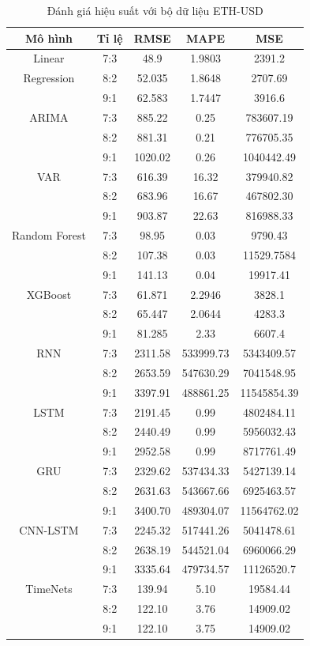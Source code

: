 \documentclass[conference]{IEEEtran}
\begin{document}
\begin{table}[H]
 \centering
 \caption{Đánh giá hiệu suất với bộ dữ liệu ETH-USD}
\begin{adjustbox}{width=0.4\textwidth}
\begin{tabular}{|c|c|c|c|c|}
\hline
Mô hình & Tỉ lệ & RMSE & MAPE & MSE \\ \hline
Linear & 7:3 & 48.9 & 1.9803 & 2391.2 \\
Regression & 8:2 & 52.035 & 1.8648 & 2707.69 \\
& 9:1 & 62.583 & 1.7447 & 3916.6 \\ \hline
ARIMA & 7:3 & 885.22 & 0.25 & 783607.19 \\
& 8:2 & 881.31 & 0.21 & 776705.35 \\
& 9:1 & 1020.02 & 0.26 & 1040442.49 \\ \hline
VAR & 7:3 & 616.39 & 16.32 & 379940.82 \\
& 8:2 & 683.96 & 16.67 & 467802.30 \\
& 9:1 &  903.87 & 22.63 & 816988.33 \\ \hline
Random Forest & 7:3 & 98.95 & 0.03 & 9790.43 \\
& 8:2 & 107.38 & 0.03 & 11529.7584 \\
& 9:1 & 141.13 & 0.04 & 19917.41 \\ \hline
XGBoost & 7:3 & 61.871 & 2.2946 & 3828.1 \\
& 8:2 & 65.447 & 2.0644 & 4283.3 \\
& 9:1 & 81.285 & 2.33 & 6607.4 \\ \hline
RNN & 7:3 & 2311.58 & 533999.73 & 5343409.57 \\
& 8:2 & 2653.59 & 547630.29 & 7041548.95 \\
& 9:1 & 3397.91 & 488861.25 & 11545854.39 \\ \hline
LSTM & 7:3 & 2191.45 & 0.99 & 4802484.11 \\
& 8:2 & 2440.49 & 0.99 & 5956032.43 \\
& 9:1 & 2952.58 & 0.99 & 8717761.49 \\ \hline
GRU & 7:3 & 2329.62 & 537434.33 & 5427139.14 \\
& 8:2 & 2631.63 & 543667.66 & 6925463.57 \\
& 9:1 & 3400.70 & 489304.07 & 11564762.02 \\ \hline
CNN-LSTM & 7:3 & 2245.32 & 517441.26 & 5041478.61 \\
& 8:2 & 2638.19 & 544521.04 & 6960066.29 \\
& 9:1 & 3335.64 & 479734.57 & 11126520.7 \\ \hline
TimeNets & 7:3 & 139.94 & 5.10 & 19584.44 \\
& 8:2 & 122.10 & 3.76 & 14909.02 \\
& 9:1 & 122.10 & 3.75 & 14909.02 \\ \hline
\end{tabular}
\end{adjustbox}
\end{table}\\
\end{document}
